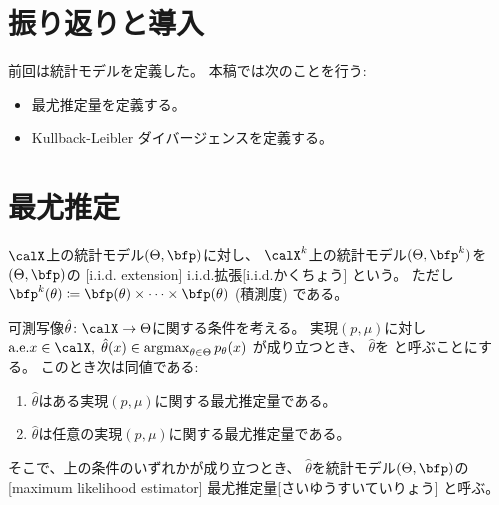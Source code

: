 \documentclass[report]{jlreq}
\begin{document}
%

%
\section*{振り返りと導入}

前回は統計モデルを定義した。
本稿では次のことを行う:
\begin{itemize}
    \item 最尤推定量を定義する。
    \item Kullback-Leibler ダイバージェンスを定義する。
\end{itemize}

%
\section{最尤推定}

\begin{definition}[i.i.d.拡張]
    $\calX$上の統計モデル$(\Theta, \bfp)$に対し、
    $\calX^k$上の統計モデル$(\Theta, \bfp^k)$を
    $(\Theta, \bfp)$の
    [i.i.d. extension]
        {i.i.d.拡張}[i.i.d.かくちょう]
    という。
    ただし
    $\bfp^k(\theta)
        \coloneqq
            \bfp(\theta) \times \cdots \times \bfp(\theta)$
    (積測度) である。
\end{definition}

\begin{propdef}[最尤推定量]
    可測写像$\hat{\theta} \colon \calX \to \Theta$に関する条件を考える。
    実現$(p, \mu)$に対し
    $\text{a.e.} x \in \calX, \;
        \hat{\theta}(x) \in \argmax_{\theta \in \Theta} p_\theta(x)$
    が成り立つとき、
    $\hat{\theta}$を
    と呼ぶことにする。
    このとき次は同値である:
    \begin{enumerate}
        \item $\hat{\theta}$はある実現$(p, \mu)$に関する最尤推定量である。
        \item $\hat{\theta}$は任意の実現$(p, \mu)$に関する最尤推定量である。
    \end{enumerate}
    そこで、上の条件のいずれかが成り立つとき、
    $\hat{\theta}$を統計モデル$(\Theta, \bfp)$の
    [maximum likelihood estimator]
        {最尤推定量}[さいゆうすいていりょう]
    と呼ぶ。
\end{propdef}
\end{document}

